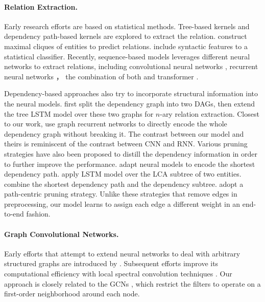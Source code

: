 \documentclass[11pt,a4paper]{article}
\begin{document}
\paragraph{Relation Extraction.} 
Early research efforts are based on statistical methods. Tree-based kernels \citep{Zelenko2002KernelMF} and dependency path-based kernels \citep{Bunescu2005ASP} are explored to extract the relation. \citet{McDonald2005SimpleAF} construct maximal cliques of entities to predict relations. \citet{Mintz2009DistantSF} include syntactic features to a statistical classifier. Recently, sequence-based models leverages different neural networks to extract relations, including convolutional neural networks \citep{Zeng2014RelationCV, Nguyen2015RelationEP, Wang2016RelationCV}, recurrent neural networks \citep{Zhou2016AttentionBasedBL, Zhang2017PositionawareAA}， the combination of both \citep{Vu2016CombiningRA} and transformer \citep{Verga2018SimultaneouslyST}. 

Dependency-based approaches also try to incorporate structural information into the neural models. \citet{Peng2017CrossSentenceNR} first split the dependency graph into two DAGs, then extend the tree LSTM model \citep{Tai2015ImprovedSR} over these two graphs for $n$-ary relation extraction. Closest to our work, \citet{Song2018NaryRE} use graph recurrent networks \citep{Song2018AGM} to directly encode the whole dependency graph without breaking it. The contrast between our model and theirs is reminiscent of the contrast between CNN and RNN. Various pruning strategies have also been proposed to distill the dependency information in order to further improve the performance. \citet{Xu2015SemanticRC,Xu2015ClassifyingRV} adapt neural models to encode the shortest dependency path. \citet{Miwa2016EndtoEndRE} apply LSTM model over the LCA subtree of two entities. \citet{Liu2015ADN} combine the shortest dependency path and the dependency subtree. \citet{Zhang2018GraphCO} adopt a path-centric pruning strategy. Unlike these strategies that remove edges in preprocessing, our model learns to assign each edge a different weight in an end-to-end fashion.

\paragraph{Graph Convolutional Networks.} Early efforts that attempt to extend neural networks to deal with arbitrary structured graphs are introduced by \citet{Gori2005ANM, Bruna2014SpectralNA}. Subsequent efforts improve its computational efficiency with local spectral convolution techniques \citep{Henaff2015DeepCN, Defferrard2016ConvolutionalNN}. Our approach is closely related to the GCNs \citep{Kipf2016SemiSupervisedCW}, which restrict the filters to operate on a first-order neighborhood around each node. 
\end{document}
